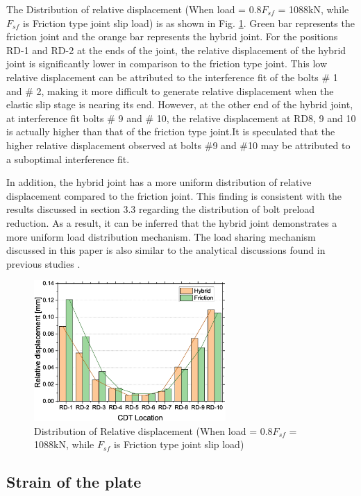 The Distribution of relative displacement (When load = 0.8$F_{sf}$ = 1088kN, while $F_{sf}$ is Friction type joint slip load) is as shown in Fig. \ref{fig-rdbar}. Green bar represents the friction joint and the orange bar represents the hybrid joint. For the positions RD-1 and RD-2 at the ends of the joint, the relative displacement of the hybrid joint is significantly lower in comparison to the friction type joint. This low relative displacement can be attributed to the interference fit of the bolts \# 1 and \# 2, making it more difficult to generate relative displacement when the elastic slip stage is nearing its end. However, at the other end of the hybrid joint, at interference fit bolts \# 9 and \# 10, the relative displacement at RD8, 9 and 10 is actually higher than that of the friction type joint.It is speculated that the higher relative displacement observed at bolts \#9 and \#10 may be attributed to a suboptimal interference fit.

In addition, the hybrid joint has a more uniform distribution of relative displacement compared to the friction joint. This finding is consistent with the results discussed in section 3.3 regarding the distribution of bolt preload reduction. As a result, it can be inferred that the hybrid joint demonstrates a more uniform load distribution mechanism. The load sharing mechanism discussed in this paper is also similar to the analytical discussions found in previous studies \cite{Chen2023MechanicalConnections}.

\begin{figure}[htbp]
    \centering
    \includegraphics[width=0.65\textwidth]{imgs/ch6/RD-bar.eps}
    \caption{Distribution of Relative displacement (When load = 0.8$F_{sf}$ = 1088kN, while $F_{sf}$ is Friction type joint slip load) }
    \label{fig-rdbar}
\end{figure}

\subsection{Strain of the plate}

